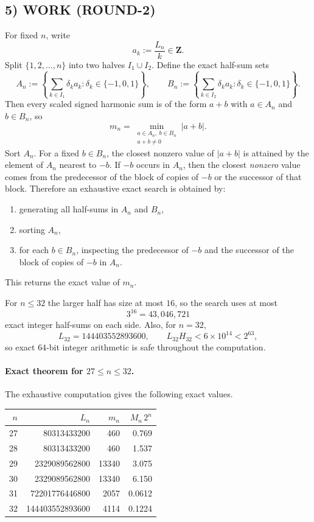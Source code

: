 \subsection*{5) WORK (ROUND-2)}
For fixed $n$, write
\[
a_k:=\frac{L_n}{k}\in \mathbf{Z}.
\]
Split $\{1,2,\dots,n\}$ into two halves $I_1\cup I_2$.
Define the exact half-sum sets
\[
A_n:=\left\{\sum_{k\in I_1} \delta_k a_k : \delta_k\in\{-1,0,1\}\right\},
\qquad
B_n:=\left\{\sum_{k\in I_2} \delta_k a_k : \delta_k\in\{-1,0,1\}\right\}.
\]
Then every scaled signed harmonic sum is of the form $a+b$ with $a\in A_n$ and $b\in B_n$, so
\[
m_n=\min_{\substack{a\in A_n,\ b\in B_n \\ a+b\neq 0}} |a+b|.
\]
Sort $A_n$.  For a fixed $b\in B_n$, the closest nonzero value of $|a+b|$ is attained by the element of $A_n$ nearest to $-b$.  If $-b$ occurs in $A_n$, then the closest \emph{nonzero} value comes from the predecessor of the block of copies of $-b$ or the successor of that block.  Therefore an exhaustive exact search is obtained by:
\begin{enumerate}
\item generating all half-sums in $A_n$ and $B_n$,
\item sorting $A_n$,
\item for each $b\in B_n$, inspecting the predecessor of $-b$ and the successor of the block of copies of $-b$ in $A_n$.
\end{enumerate}
This returns the exact value of $m_n$.

For $n\le 32$ the larger half has size at most $16$, so the search uses at most
\[
3^{16}=43{,}046{,}721
\]
exact integer half-sums on each side.  Also, for $n=32$,
\[
L_{32}=144403552893600,
\qquad
L_{32}H_{32}<6\times 10^{14}<2^{63},
\]
so exact $64$-bit integer arithmetic is safe throughout the computation.

\paragraph{Exact theorem for $27\le n\le 32$.}
The exhaustive computation gives the following exact values.

\begin{center}
\begin{tabular}{r|r|r|r}
$n$ & $L_n$ & $m_n$ & $M_n\,2^n$ \\\hline
27 & 80313433200 & 460 & 0.769 \\
28 & 80313433200 & 460 & 1.537 \\
29 & 2329089562800 & 13340 & 3.075 \\
30 & 2329089562800 & 13340 & 6.150 \\
31 & 72201776446800 & 2057 & 0.0612 \\
32 & 144403552893600 & 4114 & 0.1224
\end{tabular}
\end{center}


